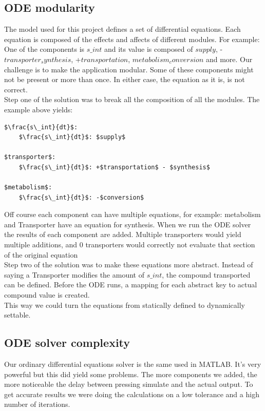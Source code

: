 \documentclass[10pt,a4paper]{report}
\begin{document}
		\subsection{ODE modularity}
			The model used for this project defines a set of differential equations. Each equation is composed of the effects and affects of different modules. For example: One of the components is $s\_int$ and its value is composed of $supply$, -$transporter_synthesis$, +$transportation$, $metabolism_conversion$ and more. Our challenge is to make the application modular. Some of these components might not be present or more than once. In either case, the equation as it is, is not correct.\\
			Step one of the solution was to break all the composition of all the modules. The example above yields:
			\begin{lstlisting}
$\frac{s\_int}{dt}$: 
	$\frac{s\_int}{dt}$: $supply$

$transporter$:
	$\frac{s\_int}{dt}$: +$transportation$ - $synthesis$
	
$metabolism$:
	$\frac{s\_int}{dt}$: -$conversion$
			\end{lstlisting}
			Off course each component can have multiple equations, for example: metabolism and Transporter have an equation for synthesis. When we run the ODE solver the results of each component are added. Multiple transporters would yield multiple additions, and 0 transporters would correctly not evaluate that section of the original equation\\
			Step two of the solution was to make these equations more abstract. Instead of saying a Transporter modifies the amount of $s\_int$, the compound transported can be defined. Before the ODE runs, a mapping for each abstract key to actual compound value is created. \\
			This way we could turn the equations from statically defined to dynamically settable.
			
		\subsection{ODE solver complexity}
			Our ordinary differential equations solver is the same used in MATLAB. It's very powerful but this did yield some problems. The more components we added, the more noticeable the delay between pressing simulate and the actual output. To get accurate results we were doing the calculations on a low tolerance and a high number of iterations.
			
\end{document}
